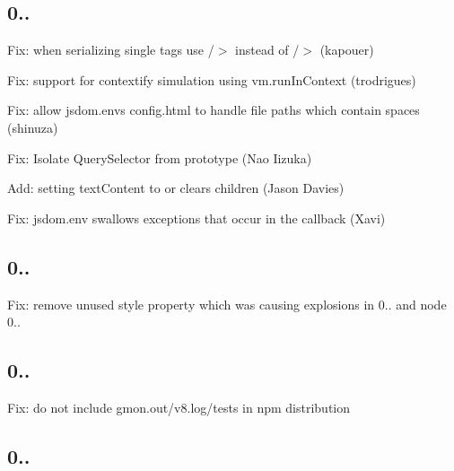\subsection*{0..}


\begin{DoxyItemize}
\item Fix\+: when serializing single tags use \textquotesingle{} /$>$\textquotesingle{} instead of \textquotesingle{}/$>$\textquotesingle{} (kapouer)
\item Fix\+: support for contextify simulation using vm.\+run\+In\+Context (trodrigues)
\item Fix\+: allow jsdom.\+env\textquotesingle{}s config.\+html to handle file paths which contain spaces (shinuza)
\item Fix\+: Isolate Query\+Selector from prototype (Nao Iizuka)
\item Add\+: setting text\+Content to \textquotesingle{}\textquotesingle{} or clears children (Jason Davies)
\item Fix\+: jsdom.\+env swallows exceptions that occur in the callback (Xavi)
\end{DoxyItemize}

\subsection*{0..}


\begin{DoxyItemize}
\item Fix\+: remove unused style property which was causing explosions in 0.. and node 0..
\end{DoxyItemize}

\subsection*{0..}


\begin{DoxyItemize}
\item Fix\+: do not include gmon.\+out/v8.log/tests in npm distribution
\end{DoxyItemize}

\subsection*{0..}


